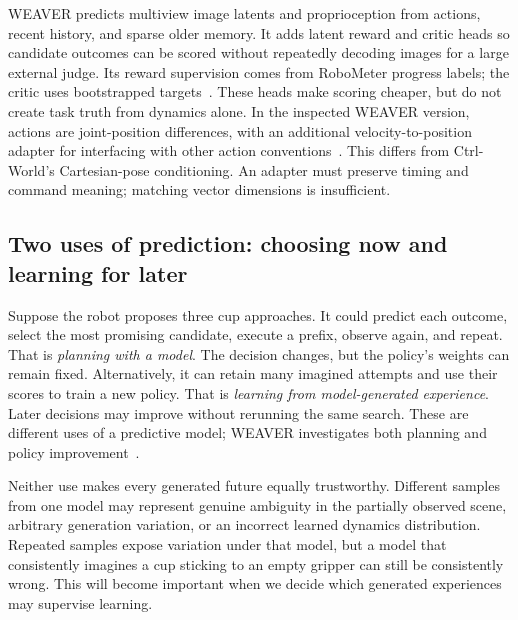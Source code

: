 WEAVER predicts multiview image latents and proprioception from actions, recent history, and sparse older memory. It adds latent reward and critic heads so candidate outcomes can be scored without repeatedly decoding images for a large external judge. Its reward supervision comes from RoboMeter progress labels; the critic uses bootstrapped targets~\citep{weaver}. These heads make scoring cheaper, but do not create task truth from dynamics alone. In the inspected WEAVER version, actions are joint-position differences, with an additional velocity-to-position adapter for interfacing with other action conventions~\citep{weaver}. This differs from Ctrl-World's Cartesian-pose conditioning. An adapter must preserve timing and command meaning; matching vector dimensions is insufficient.




\subsection{Two uses of prediction: choosing now and learning for later}
Suppose the robot proposes three cup approaches. It could predict each outcome, select the most promising candidate, execute a prefix, observe again, and repeat. That is \emph{planning with a model}. The decision changes, but the policy's weights can remain fixed. Alternatively, it can retain many imagined attempts and use their scores to train a new policy. That is \emph{learning from model-generated experience}. Later decisions may improve without rerunning the same search. These are different uses of a predictive model; WEAVER investigates both planning and policy improvement~\citep{weaver}.

Neither use makes every generated future equally trustworthy. Different samples from one model may represent genuine ambiguity in the partially observed scene, arbitrary generation variation, or an incorrect learned dynamics distribution. Repeated samples expose variation under that model, but a model that consistently imagines a cup sticking to an empty gripper can still be consistently wrong. This will become important when we decide which generated experiences may supervise learning.

